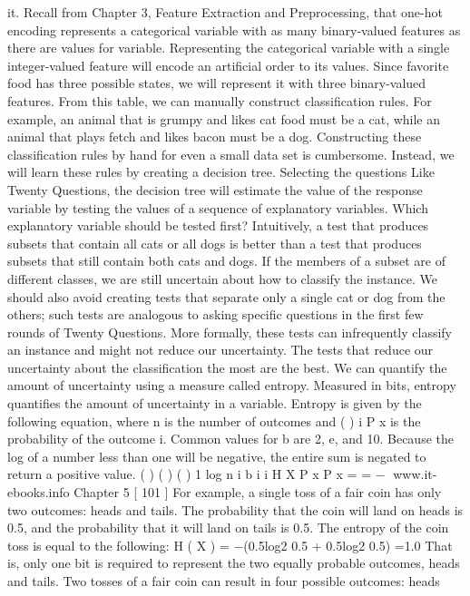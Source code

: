 it. Recall from Chapter 3, Feature Extraction and Preprocessing, that one-hot encoding
represents a categorical variable with as many binary-valued features as there are
values for variable. Representing the categorical variable with a single integer-valued
feature will encode an artificial order to its values. Since favorite food has three
possible states, we will represent it with three binary-valued features. From this table,
we can manually construct classification rules. For example, an animal that is grumpy
and likes cat food must be a cat, while an animal that plays fetch and likes bacon must
be a dog. Constructing these classification rules by hand for even a small data set is
cumbersome. Instead, we will learn these rules by creating a decision tree.
Selecting the questions
Like Twenty Questions, the decision tree will estimate the value of the response
variable by testing the values of a sequence of explanatory variables. Which
explanatory variable should be tested first? Intuitively, a test that produces subsets that
contain all cats or all dogs is better than a test that produces subsets that still contain
both cats and dogs. If the members of a subset are of different classes, we are still
uncertain about how to classify the instance. We should also avoid creating tests that
separate only a single cat or dog from the others; such tests are analogous to asking
specific questions in the first few rounds of Twenty Questions. More formally, these
tests can infrequently classify an instance and might not reduce our uncertainty. The
tests that reduce our uncertainty about the classification the most are the best. We can
quantify the amount of uncertainty using a measure called entropy.
Measured in bits, entropy quantifies the amount of uncertainty in a variable. Entropy
is given by the following equation, where n is the number of outcomes and ( ) i P x is
the probability of the outcome i. Common values for b are 2, e, and 10. Because the
log of a number less than one will be negative, the entire sum is negated to return a
positive value.
( ) ( ) ( )
1
log
n
i b i
i
H X P x P x
=
= −
www.it-ebooks.info
Chapter 5
[ 101 ]
For example, a single toss of a fair coin has only two outcomes: heads and tails. The
probability that the coin will land on heads is 0.5, and the probability that it will land
on tails is 0.5. The entropy of the coin toss is equal to the following:
H ( X ) = −(0.5log2 0.5 + 0.5log2 0.5) =1.0
That is, only one bit is required to represent the two equally probable outcomes,
heads and tails. Two tosses of a fair coin can result in four possible outcomes: heads
